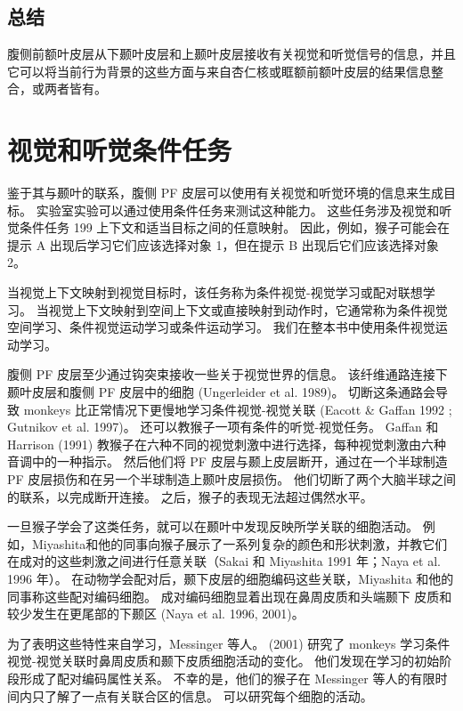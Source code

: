 \subsection{总结}
腹侧前额叶皮层从下颞叶皮层和上颞叶皮层接收有关视觉和听觉信号的信息，并且它可以将当前行为背景的这些方面与来自杏仁核或眶额前额叶皮层的结果信息整合\cite{barbas1989architecture}，或两者皆有。


\section{视觉和听觉条件任务}
\par
鉴于其与颞叶的联系，腹侧 PF 皮层可以使用有关视觉和听觉环境的信息来生成目标。 
实验室实验可以通过使用条件任务来测试这种能力。 
这些任务涉及视觉和听觉条件任务 199 上下文和适当目标之间的任意映射。
因此，例如，猴子可能会在提示 A 出现后学习它们应该选择对象 1，但在提示 B 出现后它们应该选择对象 2。
\par
当视觉上下文映射到视觉目标时，该任务称为条件视觉-视觉学习或配对联想学习。 
当视觉上下文映射到空间上下文或直接映射到动作时，它通常称为条件视觉空间学习、条件视觉运动学习或条件运动学习。
我们在整本书中使用条件视觉运动学习。
\par
腹侧 PF 皮层至少通过钩突束接收一些关于视觉世界的信息。 
该纤维通路连接下颞叶皮层和腹侧 PF 皮层中的细胞 (Ungerleider et al. 1989)。 
切断这条通路会导致 monkeys 比正常情况下更慢地学习条件视觉-视觉关联 (Eacott \& Gaffan 1992 ; Gutnikov et al. 1997)。
还可以教猴子一项有条件的听觉-视觉任务。 Gaffan 和 Harrison (1991) 教猴子在六种不同的视觉刺激中进行选择，每种视觉刺激由六种音调中的一种指示。 
然后他们将 PF 皮层与颞上皮层断开，通过在一个半球制造 PF 皮层损伤和在另一个半球制造上颞叶皮层损伤。 
他们切断了两个大脑半球之间的联系，以完成断开连接。 
之后，猴子的表现无法超过偶然水平。
\par
一旦猴子学会了这类任务，就可以在颞叶中发现反映所学关联的细胞活动。 
例如，Miyashita和他的同事向猴子展示了一系列复杂的颜色和形状刺激，并教它们在成对的这些刺激之间进行任意关联（Sakai 和 Miyashita 1991 年；Naya et al. 1996 年）。
在动物学会配对后，颞下皮层的细胞编码这些关联，Miyashita 和他的同事称这些配对编码细胞。 
成对编码细胞显着出现在鼻周皮质和头端颞下
皮质和较少发生在更尾部的下颞区 (Naya et al. 1996, 2001)。
\par
为了表明这些特性来自学习，Messinger 等人。 (2001) 研究了 monkeys 学习条件视觉-视觉关联时鼻周皮质和颞下皮质细胞活动的变化。 
他们发现在学习的初始阶段形成了配对编码属性关系。 
不幸的是，他们的猴子在 Messinger 等人的有限时间内只了解了一点有关联合区的信息。 
可以研究每个细胞的活动。
